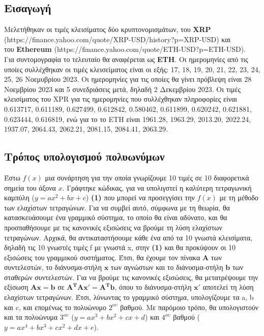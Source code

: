 \documentclass[a4paper, 14pt]{article}   %
\begin{document}
\subsection*{Εισαγωγή}   %
	Μελετήθηκαν οι τιμές κλεισίματος δύο κρυπτονομισμάτων, του \textbf{XRP}\\ (https://finance.yahoo.com/quote/XRP-USD/history?p=XRP-USD) και \\του \textbf{Ethereum} (https://finance.yahoo.com/quote/ETH-USD?p=ETH-USD). \\Για συντομογραφία το τελευταίο θα αναφέρεται ως \textbf{ETH}. Οι ημερομηνίες από τις υποίες συλλέχθηκαν οι τιμές κλεισείματος είναι οι εξής: 17, 18, 19, 20, 21, 22, 23, 24, 25, 26 Νοεμυβρίου 2023. Οι ημερομηνίες για τις οποίες θα γίνει πρόβλεψη είναι 28 Νοεμβρίου 2023 και 5 συνεδριάσεις μετά, δηλαδή 2 Δεκεμβρίου 2023. Οι τιμές κλεισίματος του XPR για τις ημερομηνίες που συλλέχθηκαν πληροφορίες είναι {\small 0.613717, 0.611189, 0.627499, 0.612842, 0.580462, 0.611899, 0.620242, 0.621881, 0.623444, 0.616819}, ενώ για το το ETH είναι {\small 1961.28, 1963.29, 2013.20, 2022.24, 1937.07, 2064.43, 2062.21, 2081.15, 2084.41, 2063.29}.

\subsection*{Τρόπος υπολογισμού πολυωνύμων}   %
	Έστω $f(x)$ μια συνάρτηση για την οποία γνωρίζουμε 10 τιμές σε 10 διαφορετικά σημεία του άξονα $x$. Γράφτηκε κώδικας, για να υπολιγστεί η καλύτερη τετραγωνική καμπύλη ($y=ax^2+bx + c$) \textbf{(1)} που μπορεί να προσεγγίσει την $f(x)$ με τη μέθοδο των ελαχίστων τετραγώνων. Για να συμβεί αυτό, σύμφωνα με τη θεωρία, θα κατασκευάσουμε ένα γραμμικό σύστημα, το οποίο θα είναι αδύνατο, και θα προσπαθήσουμε με τις κανονικές εξισώσεις να βρούμε τη λύση ελαχίστων τετραγώνων. Αρχικά, θα αντικαταστήσουμε κάθε ένα από τα 10 γνωστά κλεισίματα, δηλαδή τις 10 γνωστές τιμές f με γνωστά x, στην \textbf{(1)} και θα προκύψουν οι 10 εξισώσεις του γραμμικού συστήματος. Έτσι, θα έχουμε τον πίνακα $\mathbf{A}$ των συντελεστών, το διάνυσμα-στήλη $\mathbf{x}$ των αγνώστων και το διάνυσμα-στήλη $\mathbf{b}$ των σταθερών συντελεστών. Για να βρούμε τις κανονικές εξισώσεις, θα μετατρέψουμε την εξίσωση $\mathbf{A}\mathbf{x}=\mathbf{b}$ σε $\mathbf{A^T}\mathbf{A}\mathbf{x'}=\mathbf{A^T}\mathbf{b}$, όπου το διάνυσμα-στήλη $\mathbf{x'}$ αποτελεί τη λύση ελαχίστων τετραγώνων. Έτσι, λύνωντας το γραμμικό σύστημα, υπολογίζουμε τα a, b και c, και επομένως το πολυώνυμο $2^{ου}$ βαθμού. Με παρόμοιο τρόπο, θα υπολογιστούν και τα πολυώνυμα  $3^{ου}$ ($y=ax^3+bx^2+ cx + d$) και  $4^{ου}$ βαθμού ($y=ax^4+bx^3 + cx^2 + dx + e$).
\end{document}

